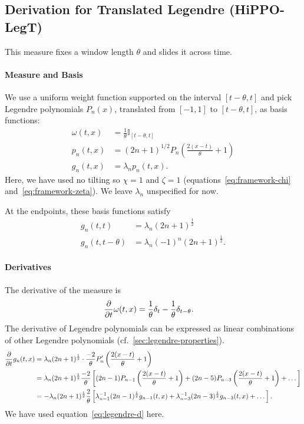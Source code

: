 \documentclass[../../hippo]{subfiles}
\begin{document}
\subsection{Derivation for Translated Legendre (HiPPO-LegT)}
\label{sec:derivation-legt}

This measure fixes a window length $\theta$ and slides it across time.


\paragraph{Measure and Basis}
We use a uniform weight function supported on the interval $[t - \theta, t]$ and pick
Legendre polynomials $P_n(x)$, translated from $[-1, 1]$ to $[t - \theta, t]$, as basis
functions:
\begin{align*}
  \omega(t, x) &= \frac{1}{\theta} \mathbb{I}_{[t-\theta, t]}
  \\
  p_n(t, x) &= (2n+1)^{1/2} P_n\left( \frac{2(x-t)}{\theta} + 1 \right)
  \\
  g_n(t, x) &= \lambda_n p_n(t, x)
  .
\end{align*}
Here, we have used no tilting so $\chi = 1$ and $\zeta = 1$ (equations~\eqref{eq:framework-chi} and~\eqref{eq:framework-zeta}).
We leave $\lambda_n$ unspecified for now.




At the endpoints, these basis functions satisfy
\begin{align*}
  g_n(t, t) &= \lambda_n (2n+1)^{\frac{1}{2}}
  \\
  g_n(t, t-\theta) &= \lambda_n (-1)^{n} (2n+1)^{\frac{1}{2}}
  .
\end{align*}


\paragraph{Derivatives}
The derivative of the measure is
\begin{align*}
  \frac{\partial}{\partial t} \omega(t, x) &= \frac{1}{\theta} \delta_t - \frac{1}{\theta} \delta_{t-\theta}
  .
\end{align*}
The derivative of Legendre polynomials can be expressed as linear combinations of
other Legendre polynomials (cf.\ \cref{sec:legendre-properties}).
\begin{align*}
  \frac{\partial}{\partial t} g_n(t, x) &= \lambda_n (2n+1)^{\frac{1}{2}} \cdot \frac{-2}{\theta} P_n'\left( \frac{2(x-t)}{\theta} + 1 \right)
  \\
  &= \lambda_n (2n+1)^{\frac{1}{2}} \frac{-2}{\theta} \left[ (2n-1)P_{n-1}\left( \frac{2(x-t)}{\theta} + 1 \right) + (2n-5) P_{n-3}\left( \frac{2(x-t)}{\theta} + 1 \right) + \dots \right]
  \\
  &= - \lambda_n (2n+1)^{\frac{1}{2}} \frac{2}{\theta} \left[ \lambda_{n-1}^{-1} (2n-1)^{\frac{1}{2}} g_{n-1}(t, x) + \lambda_{n-3}^{-1} (2n-3)^{\frac{1}{2}} g_{n-3}(t, x) + \dots \right]
  .
\end{align*}
We have used equation~\eqref{eq:legendre-d} here.
\end{document}
